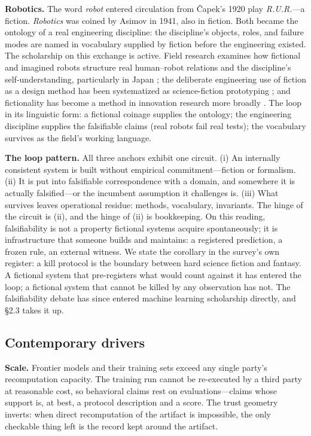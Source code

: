 \documentclass[11pt,a4paper]{article}
\begin{document}
\textbf{Robotics.} The word \textit{robot} entered circulation from Čapek's 1920 play \textit{R.U.R.}—a fiction. \textit{Robotics} was coined by Asimov in 1941, also in fiction. Both became the ontology of a real engineering discipline: the discipline's objects, roles, and failure modes are named in vocabulary supplied by fiction before the engineering existed. The scholarship on this exchange is active. Field research examines how fictional and imagined robots structure real human–robot relations and the discipline's self-understanding, particularly in Japan \cite{key22}; the deliberate engineering use of fiction as a design method has been systematized as science-fiction prototyping \cite{key23}; and fictionality has become a method in innovation research more broadly \cite{key24}. The loop in its linguistic form: a fictional coinage supplies the ontology; the engineering discipline supplies the falsifiable claims (real robots fail real tests); the vocabulary survives as the field's working language.

\textbf{The loop pattern.} All three anchors exhibit one circuit. (i) An internally consistent system is built without empirical commitment—fiction or formalism. (ii) It is put into falsifiable correspondence with a domain, and somewhere it is actually falsified—or the incumbent assumption it challenges is. (iii) What survives leaves operational residue: methods, vocabulary, invariants. The hinge of the circuit is (ii), and the hinge of (ii) is bookkeeping. On this reading, falsifiability is not a property fictional systems acquire spontaneously; it is infrastructure that someone builds and maintains: a registered prediction, a frozen rule, an external witness. We state the corollary in the survey's own register: a kill protocol is the boundary between hard science fiction and fantasy. A fictional system that pre-registers what would count against it has entered the loop; a fictional system that cannot be killed by any observation has not. The falsifiability debate has since entered machine learning scholarship directly, and §2.3 takes it up.

\subsection{Contemporary drivers}

\textbf{Scale.} Frontier models and their training sets exceed any single party's recomputation capacity. The training run cannot be re-executed by a third party at reasonable cost, so behavioral claims rest on evaluations—claims whose support is, at best, a protocol description and a score. The trust geometry inverts: when direct recomputation of the artifact is impossible, the only checkable thing left is the record kept around the artifact.
\end{document}
